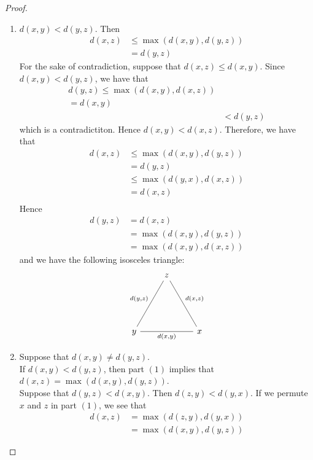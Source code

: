 \documentclass{book}
\begin{document}
\begin{proof}\
	\begin{enumerate}
		\item  $d(x,y) < d(y,z)$. Then 
		\begin{align*}
			d(x,z)
			& \leq \max(d(x,y), d(y,z)) \\
			& = d(y,z)
		\end{align*}
		For the sake of contradiction, suppose that $d(x,z) \leq d(x,y)$. Since $d(x,y) < d(y,z)$, we have that 
		\begin{align*}
			d(y,z) 
			\leq \max(d(x,y), d(x,z)) \\
			= d(x, y) \\
			& < d(y, z)
		\end{align*}
		which is a contradictiton. Hence $d(x, y) < d(x,z)$. Therefore, we have that 
		\begin{align*}
			d(x,z)
			& \leq \max(d(x,y), d(y,z)) \\
			& = d(y,z) \\
			& \leq \max(d(y, x), d(x, z)) \\
			& = d(x, z) \\
		\end{align*}
		Hence
		\begin{align*}
			d(y,z)
			& = d(x,z) \\
			& = \max(d(x,y), d(y,z)) \\
			& = \max(d(x,y), d(x,z))
		\end{align*}
		and we have the following isosceles triangle: 
		\[ 
		\begin{tikzcd}
			& z \arrow[dddr, dash, "{d(x, z)}"] \arrow[dddl, dash, "{d(y,z)}"']& \\
			& & \\
			& & \\
			y  \arrow[rr, dash, "{d(x,y)}"']  & & x 
		\end{tikzcd}
		\] 
		\item Suppose that $d(x,y) \neq d(y,z)$. \\
		If $d(x,y) < d(y,z)$, then part $(1)$ implies that $d(x,z) = \max(d(x,y), d(y,z))$. \\
		Suppose that $d(y,z) < d(x,y)$. Then $d(z,y) < d(y, x)$. If we permute $x$ and $z$ in part $(1)$, we see that
		\begin{align*}
			d(x,z) 
			& = \max(d(z,y), d(y,x)) \\
			& = \max(d(x,y), d(y,z))
		\end{align*}
	\end{enumerate}
\end{proof}
\end{document}
